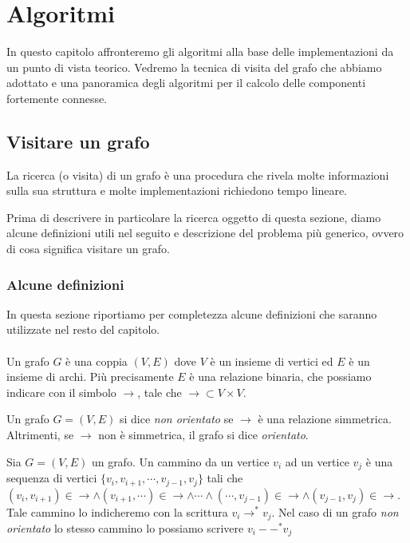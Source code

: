 \chapter{Algoritmi}
\label{chapter:theoretical-background}

In questo capitolo affronteremo gli algoritmi alla base delle
implementazioni da un punto di vista teorico. Vedremo la tecnica di
visita del grafo che abbiamo adottato e una panoramica degli algoritmi
per il calcolo delle componenti fortemente connesse.

\section{Visitare un grafo}

La ricerca (o visita) di un grafo \`e una procedura che rivela molte
informazioni sulla sua struttura e molte implementazioni richiedono
tempo lineare.

Prima di descrivere in particolare la ricerca oggetto di questa
sezione, diamo alcune definizioni utili nel seguito e descrizione del
problema pi\`u generico, ovvero di cosa significa visitare un grafo.

\subsection{Alcune definizioni}
\label{subsection:some-definitions}
In questa sezione riportiamo per completezza alcune definizioni che
saranno utilizzate nel resto del capitolo.
\\\\
Un grafo $G$ \`e una coppia $(V, E)$ dove $V$ \`e un insieme di
vertici ed $E$ \`e un insieme di archi. Pi\`u precisamente $E$ \`e una
relazione binaria, che possiamo indicare con il simbolo $\rightarrow$,
tale che $\rightarrow \subset V \times V$. 

Un grafo $G = (V, E)$ si dice \emph{non orientato} se $\rightarrow$
\`e una relazione simmetrica. Altrimenti, se $\rightarrow$ non \`e
simmetrica, il grafo si dice \emph{orientato}.

Sia $G = (V, E)$ un grafo. Un cammino da un vertice $v_{i}$ ad un
vertice $v_{j}$ \`e una sequenza di vertici $\{v_{i}, v_{i+1}, \cdots,
v_{j-1}, v_{j}\}$ tali che $(v_{i},v_{i+1}) \in \rightarrow \wedge
(v_{i+1}, \cdots) \in \rightarrow \wedge \cdots \wedge (\cdots,
v_{j-1}) \in \rightarrow \wedge (v_{j-1}, v_{j}) \in
\rightarrow$. Tale cammino lo indicheremo con la scrittura $v_{i}
\rightarrow^{*} v_{j}$. Nel caso di un grafo \emph{non orientato} lo
stesso cammino lo possiamo scrivere $v_{i} --^{*} v_{j}$

